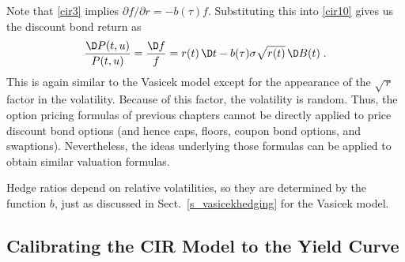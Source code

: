 Note that  \eqref{cir3} implies $\partial f/\partial r = - b(\tau)f$.  Substituting this into  \eqref{cir10} gives us the discount bond return as
\begin{equation}\label{cirdpp}
\frac{\D P(t,u)}{P(t,u)} =\frac{\D f}{f} =   r(t)\,\D t - b(\tau)\sigma\sqrt{r(t)}\,\D B(t)\;.
\end{equation}
This is again similar to the Vasicek model except for the appearance of the $\sqrt{\,r}$ factor in the volatility.  Because of this factor, the volatility is random.  Thus, the option pricing formulas of previous chapters cannot be directly applied to price discount bond options (and hence caps, floors, coupon bond options, and swaptions).  Nevertheless, the ideas underlying those formulas can be applied to obtain similar valuation formulas.

Hedge ratios depend on relative volatilities, so they are determined by the function $b$, just as discussed in Sect.~\ref{s_vasicekhedging} for the Vasicek model.

\subsection*{Calibrating the CIR Model to the Yield Curve}

